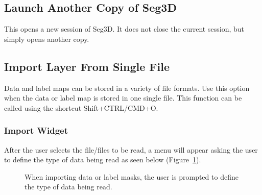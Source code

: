\documentclass[fleqn,11pt,openany]{book}
\begin{document}
\subsection{Launch Another Copy of Seg3D}
This opens a new session of Seg3D.  It does not close the current session, but simply opens another copy.

\subsection{Import Layer From Single File}
\label{sec:importsinglefile}
Data and label maps can be stored in a variety of file formats.  Use this option when the data or label map is stored in one single file.  This function can be called using the shortcut Shift+CTRL/CMD+O.

\subsubsection{Import Widget}
After the user selects the file/files to be read, a menu will appear asking the user to define the type of data being read as seen below (Figure~\ref{fig:ImportWidget}).

\begin{figure}[h!]
\caption{When importing data or label masks, the user is prompted to define the type of data being read.}\label{fig:ImportWidget}
\end{figure}
\end{document}

